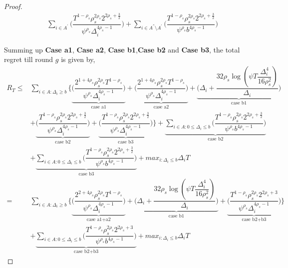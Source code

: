 \begin{proof}
\begin{align*}
&\sum_{i\in A^{'}}\bigg(\dfrac{T^{1-\rho_{s}}\rho_{s}^{2\rho_{s}}2^{2\rho_{s}+\frac{3}{2}}}{\psi^{\rho_{s}}\Delta_{i}^{4\rho_{s}-1}} \bigg)+\sum_{i\in A^{''}\setminus A^{'}}\bigg(\dfrac{T^{1-\rho_{s}}\rho_{s}^{2\rho_{s}}2^{2\rho_{s}+\frac{3}{2}}}{\psi^{\rho_{s}}b^{4\rho_{s}-1}} \bigg)
\end{align*}
 
Summing up \textbf{Case a1}, \textbf{Case a2}, \textbf{Case b1},\textbf{Case b2} and \textbf{Case b3}, the total regret till round $g$ is given by,
\begin{align*}
	R_{T} \leq & \sum_{i\in A:\Delta_{i}\geq b}\bigg\lbrace\underbrace{\bigg(\dfrac{2^{1+4\rho_{s}}\rho_{s}^{2\rho_{s}}T^{1-\rho_{s}}}{\psi^{\rho_{s}}\Delta_{i}^{4\rho_{s}-1}}\bigg)}_{\text{case a1}} + \underbrace{\bigg(\dfrac{2^{1+4\rho_{s}}\rho_{s}^{2\rho_{s}}T^{1-\rho_{s}}}{\psi^{\rho_{s}}\Delta_{i}^{4\rho_{s}-1}}\bigg)}_{\text{case a2}} + \underbrace{\bigg(\Delta_{i}+\dfrac{32\rho_{s}\log{(\psi T\dfrac{\Delta_{i}^{4}}{16\rho_{s}^{2}})}}{\Delta_{i}}\bigg)}_{\text{case b1}} \\
	& + \underbrace{\bigg(\dfrac{T^{1-\rho_{s}}\rho_{s}^{2\rho_{s}}2^{2\rho_{s}+\frac{3}{2}}}{\psi^{\rho_{s}}\Delta_{i}^{4\rho_{s} -1}} \bigg)}_{\text{case b2}} + \underbrace{\bigg(\dfrac{T^{1-\rho_{s}}\rho_{s}^{2\rho_{s}}2^{2\rho_{s}+\frac{3}{2}}}{\psi^{\rho_{s}}\Delta_{i}^{4\rho_{s} -1}} \bigg)}_{\text{case b3}}\bigg \rbrace+\underbrace{\sum_{i\in A:0\leq\Delta_{i}\leq b}\bigg(\dfrac{T^{1-\rho_{s}}\rho_{s}^{2\rho_{s}}2^{2\rho_{s}+\frac{3}{2}}}{\psi^{\rho_{s}}b^{4\rho_{s} -1}} \bigg)}_{\text{case b2}} \\
   &	+ \underbrace{\sum_{i\in A:0\leq\Delta_{i}\leq b}\bigg(\dfrac{T^{1-\rho_{s}}\rho_{s}^{2\rho_{s}}2^{2\rho_{s}+\frac{3}{2}}}{\psi^{\rho_{s}}b^{4\rho_{s} -1}} \bigg)}_{\text{case b3}} + max_{i:\Delta_{i}\leq b}\Delta_{i}T\\
  = & \sum\limits_{i\in A:\Delta_{i}\geq b}\bigg\lbrace\underbrace{\bigg(\dfrac{2^{2+4\rho_{s}}\rho_{s}^{2\rho_{s}}T^{1-\rho_{s}}}{\psi^{\rho_{s}}\Delta_{i}^{4\rho_{s}-1}}\bigg)}_{\text{case a1+a2}} + \underbrace{\bigg(\Delta_{i}+\dfrac{32\rho_{s}\log{(\psi T\dfrac{\Delta_{i}^{4}}{16\rho_{s}^{2}})}}{\Delta_{i}}\bigg)}_{\text{case b1}}  +  \underbrace{\bigg(\dfrac{T^{1-\rho_{s}}\rho_{s}^{2\rho_{s}}2^{2\rho_{s}+3}}{\psi^{\rho_{s}}\Delta_{i}^{4\rho_{s} -1}} \bigg)}_{\text{case b2+b3}}\bigg \rbrace \\
  & +\underbrace{\sum\limits_{i\in A:0\leq\Delta_{i}\leq b}\bigg(\dfrac{T^{1-\rho_{s}}\rho_{s}^{2\rho_{s}}2^{2\rho_{s}+3}}{\psi^{\rho_{s}}b^{4\rho_{s} -1}} \bigg)}_{\text{case b2+b3}} + max_{i:\Delta_{i}\leq b}\Delta_{i}T
\end{align*}
  
\end{proof}

